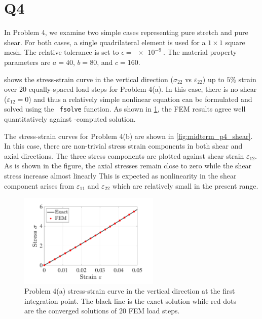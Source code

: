 \section*{Q4}
In Problem 4, we examine two simple cases representing pure stretch and pure shear. 
For both cases, a single quadrilateral element is used for a $1 \times 1$ square mesh. 
The relative tolerance is set to $\epsilon = \qty{e-9}{}$.
The material property parameters are $a = 40$, $b = 80$, and $c = 160$. 

 shows the stress-strain curve in the vertical direction ($\sigma_{22}$ vs $\varepsilon_{22}$) up to $5\%$ strain over 20 equally-spaced load steps for Problem 4(a). 
In this case, there is no shear ($\varepsilon_{12} = 0$) and thus a relatively simple nonlinear equation can be formulated and solved using the \matlab~\texttt{fsolve} function. 
As shown in \cref{fig:midterm_p4_stretch}, the FEM results agree well quantitatively against \matlab-computed solution. 

The stress-strain curves for Problem 4(b) are shown in \cref{fig:midterm_p4_shear}. 
In this case, there are non-trivial stress strain components in both shear and axial directions. 
The three stress components are plotted against shear strain $\varepsilon_{12}$. 
As is shown in the figure, the axial stresses remain close to zero while the shear stress increase almost linearly
This is expected as nonlinearity in the shear component arises from $\varepsilon_{11}$ and $\varepsilon_{22}$ which are relatively small in the present range. 
\begin{figure}[!ht]
    \centering
    \includegraphics[width=0.6\textwidth]{midterm/midterm_p4_stretch.pdf}
    \caption{Problem 4(a) stress-strain curve in the vertical direction at the first integration point. 
    The black line is the exact solution while red dots are the converged solutions of 20 FEM load steps. }
    \label{fig:midterm_p4_stretch}
\end{figure}

